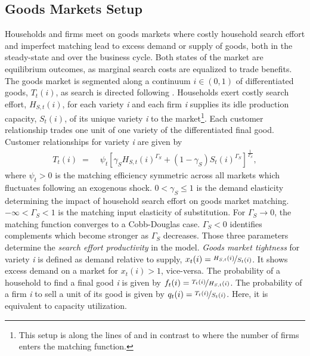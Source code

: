 \documentclass[12pt,3p,authoryear,review]{elsarticle}
\begin{document}
\subsection{Goods Markets Setup}%
Households and firms meet on goods markets where costly household search effort and imperfect matching lead to excess demand or supply of goods, both in the steady-state and over the business cycle. Both states of the market are equilibrium outcomes, as marginal search costs are equalized to trade benefits. The goods market is segmented along a continuum $i \in (0,1)$ of differentiated goods, $T_t(i)$, as search is directed following \cite{moenCompetitiveSearchEquilibrium1997}. Households exert costly search effort, $H_{S,t}(i)$, for each variety \textit{i} and each firm \textit{i} supplies its idle production capacity, $S_t(i)$, of its unique variety \textit{i} to the market\footnote{This setup is along the lines of \cite{michaillatAggregateDemandIdle2015,sun2024excess} and in contrast to \cite{bai2025demand,qiuProcyclicalProductivityNew2022} where the number of firms enters the matching function.}. Each customer relationship trades one unit of one variety of the differentiated final good. Customer relationships for variety \textit{i} are given by%
\begin{align}\label{eq:goods_matching}%
 	T_t(i) \; = & \; \psi_{t} \left[\gamma_S H_{S,t}(i)^{\Gamma_S} + \left(1-\gamma_S\right) S_t(i)^{\Gamma_S}\right]^{\frac{1}{\Gamma_S}},%
\end{align}%
where $\psi_{t}>0$ is the matching efficiency symmetric across all markets which fluctuates following an exogenous shock. $0<\gamma_S \leq 1$ is the demand elasticity determining the impact of household search effort on goods market matching. $-\infty<\Gamma_S<1$ is the matching input elasticity of substitution. For $\Gamma_S \rightarrow 0$, the matching function converges to a Cobb-Douglas case. $\Gamma_S < 0$ identifies complements which become stronger as $\Gamma_S$ decreases. Those three parameters determine the \emph{search effort productivity} in the model. \emph{Goods market tightness} for variety \textit{i} is defined as demand relative to supply, $x_{t}(i) = \nicefrac{H_{S,t}(i)}{S_t(i)}$. It shows excess demand on a market for $x_t(i)>1$, vice-versa. The probability of a household to find a final good \textit{i} is given by $f_{t}(i) = \nicefrac{T_t(i)}{H_{S,t}(i)}$. The probability of a firm \textit{i} to sell a unit of its good is given by $q_{t}(i) = \nicefrac{T_t(i)}{S_t(i)}$. Here, it is equivalent to capacity utilization.%
\end{document}

